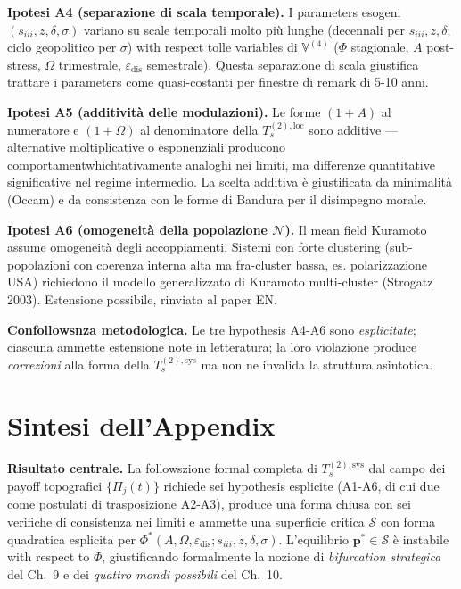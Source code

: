 \Conj{} \textbf{Ipotesi A4 (separazione di scala temporale).} I
parameters esogeni \((s_{iii}, z, \delta, \sigma)\) variano su scale
temporali molto più lunghe (decennali per \(s_{iii}, z, \delta\); ciclo
geopolitico per \(\sigma\)) with respect tolle variables di
\(\mathbb{V}^{(4)}\) (\(\Phi\) stagionale, \(A\) post-stress, \(\Omega\)
trimestrale, \(\varepsilon_{\text{dis}}\) semestrale). Questa
separazione di scala giustifica trattare i parameters come quasi-costanti
per finestre di remark di 5-10 anni.

\Conj{} \textbf{Ipotesi A5 (additività delle modulazioni).} Le forme
\((1+A)\) al numeratore e \((1+\Omega)\) al denominatore della
\(T_s^{(2),\text{loc}}\) sono additive --- alternative moltiplicative o
esponenziali producono comportamentwhichtativamente analoghi nei
limiti, ma differenze quantitative significative nel regime intermedio.
La scelta additiva è giustificata da minimalità (Occam) e da consistenza
con le forme di Bandura per il disimpegno morale.

\Conj{} \textbf{Ipotesi A6 (omogeneità della popolazione
\(\mathcal{N}\)).} Il mean field Kuramoto assume omogeneità degli
accoppiamenti. Sistemi con forte clustering (sub-popolazioni con
coerenza interna alta ma fra-cluster bassa, es. polarizzazione USA)
richiedono il modello generalizzato di Kuramoto multi-cluster (Strogatz
2003). Estensione possibile, rinviata al paper EN.

\Proved{} \textbf{Confollowsnza metodologica.} Le tre hypothesis A4-A6 sono
\emph{esplicitate}; ciascuna ammette estensione note in letteratura; la
loro violazione produce \emph{correzioni} alla forma della
\(T_s^{(2),\text{sys}}\) ma non ne invalida la struttura asintotica.



\section{Sintesi dell'Appendix}\label{sintesi-dellappendix}

\Proved{} \textbf{Risultato centrale.} La followszione formal completa
di \(T_s^{(2),\text{sys}}\) dal campo dei payoff topografici
\(\{\Pi_j(t)\}\) richiede sei hypothesis esplicite (A1-A6, di cui due come
postulati di trasposizione A2-A3), produce una forma chiusa con sei
verifiche di consistenza nei limiti e ammette una superficie critica
\(\mathcal{S}\) con forma quadratica esplicita per
\(\Phi^*(A, \Omega, \varepsilon_{\text{dis}}; s_{iii}, z, \delta, \sigma)\).
L'equilibrio \(\boldsymbol{p}^* \in \mathcal{S}\) è instabile with respect to
\(\Phi\), giustificando formalmente la nozione di \emph{bifurcation
strategica} del Ch.~9 e dei \emph{quattro mondi possibili} del Ch.~10.


